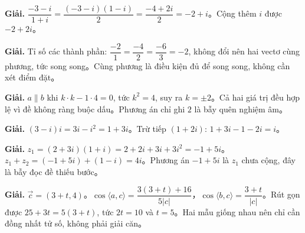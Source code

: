 \documentclass[11pt, a4paper]{article}
\begin{document}
\vspace{0.3cm}
\begin{dapan}[6 — Đáp án D]

\textbf{Giải.} $\dfrac{-3-i}{1+i}=\dfrac{(-3-i)(1-i)}{2}=\dfrac{-4+2i}{2}=-2+i$。Cộng thêm $i$ được $-2+2i$。


\end{dapan}
\vspace{0.3cm}
\begin{dapan}[7 — Đáp án A]

\textbf{Giải.} Tỉ số các thành phần: $\dfrac{-2}{1}=\dfrac{-4}{2}=\dfrac{-6}{3}=-2$, không đổi nên hai vectơ cùng phương, tức song song。Cùng phương là điều kiện đủ để song song, không cần xét điểm đặt。


\end{dapan}
\vspace{0.3cm}
\begin{dapan}[8 — Đáp án B]

\textbf{Giải.} $a\parallel b$ khi $k\cdot k-1\cdot4=0$, tức $k^2=4$, suy ra $k=\pm2$。Cả hai giá trị đều hợp lệ vì đề không ràng buộc dấu。Phương án chỉ ghi $2$ là bẫy quên nghiệm âm。


\end{dapan}
\vspace{0.3cm}
\begin{dapan}[9 — Đáp án A]

\textbf{Giải.} $(3-i)i=3i-i^2=1+3i$。Trừ tiếp $(1+2i)$: $1+3i-1-2i=i$。


\end{dapan}
\vspace{0.3cm}
\begin{dapan}[10 — Đáp án D]

\textbf{Giải.} $z_1=(2+3i)(1+i)=2+2i+3i+3i^2=-1+5i$。$z_1+z_2=(-1+5i)+(1-i)=4i$。Phương án $-1+5i$ là $z_1$ chưa cộng, đây là bẫy đọc đề thiếu bước。


\end{dapan}
\vspace{0.3cm}
\begin{dapan}[11 — Đáp án A]

\textbf{Giải.} $\vec{c}=(3+t,4)$。$\cos\langle a,c\rangle=\dfrac{3(3+t)+16}{5\lvert c\rvert}$，$\cos\langle b,c\rangle=\dfrac{3+t}{\lvert c\rvert}$。Rút gọn được $25+3t=5(3+t)$, tức $2t=10$ và $t=5$。Hai mẫu giống nhau nên chỉ cần đồng nhất tử số, không phải giải căn。


\end{dapan}
\vspace{0.3cm}
\end{document}
